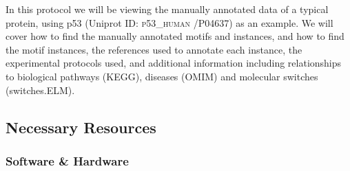 \documentclass[12pt]{article}
\newcounter{proto}
\newcommand\uniprot[1]{%
	\textsc{\lowercase{#1}}%
}
\begin{document}
In this protocol we will be viewing the manually annotated data of a
typical protein, using p53 (Uniprot ID: \uniprot{P53\_HUMAN}/P04637) as an
example. We will cover how to find the manually annotated motifs and instances,
and how to find the motif instances, the references used to annotate each
instance, the experimental protocols used, and additional information including
relationships to biological pathways (KEGG), diseases (OMIM) and molecular
switches (switches.ELM).

%
%
\subsection*{Necessary Resources}
\subsubsection*{Software \& Hardware}

\end{document}
